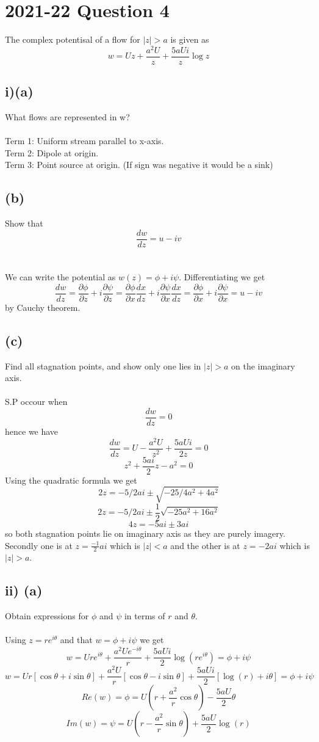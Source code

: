 \documentclass[1pt]{article}
\begin{document}
\tableofcontents
\newpage
\section{2021-22 Question 4}
The complex potentisal of a flow for $|z|>a$ is given as $$w=Uz+\frac{a^2U}{z}+\frac{5aUi}{z}\log z$$
\subsection{i)(a)}
What flows are represented in w?
\\
\\Term 1: Uniform stream parallel to x-axis.
\\Term 2: Dipole at origin.
\\Term 3: Point source at origin. (If sign was negative it would be a sink)
\subsection{(b)}
Show that $$\frac{dw}{dz}=u-iv$$
\\
\\ We can write the potential as $w(z)=\phi+i\psi$. Differentiating we get $$\frac{dw}{dz}=\frac{\partial\phi}{\partial z}+i\frac{\partial \psi}{\partial z}=\frac{\partial\phi}{\partial x}\frac{dx}{dz}+i\frac{\partial\psi}{\partial x}\frac{dx}{dz}=\frac{\partial\phi}{\partial x}+i\frac{\partial\psi}{\partial x}=u-iv$$ by Cauchy theorem.
\subsection{(c)}
Find all stagnation points, and show only one lies in $|z|>a$ on the imaginary axis.
\\
\\S.P occour when $$\frac{dw}{dz}=0$$ hence we have $$\frac{dw}{dz}=U-\frac{a^2U}{z^2}+\frac{5aUi}{2z}=0$$
$$z^2+\frac{5ai}{2}z-a^2=0$$ Using the quadratic formula we get $$2z=-5/2ai\pm \sqrt{-25/4a^2+4a^2}$$ $$2z=-5/2ai\pm \frac{1}{2}\sqrt{-25a^2+16a^2}$$
$$4z=-5ai\pm 3ai$$ so both stagnation points lie on imaginary axis as they are purely imagery. Secondly one is at $z=\frac{-1}{2}ai$ which is $|z|<a$ and the other is at $z=-2ai$ which is $|z|>a$.
\subsection{ii) (a)}
Obtain expressions for $\phi$ and $\psi$ in terms of $r$ and $\theta$.
\\
\\Using $z=re^{i\theta}$ and that $w=\phi+i\psi$ we get $$w=Ure^{i\theta}+\frac{a^2Ue^{-i\theta}}{r}+\frac{5aUi}{2}\log(re^{i\theta})=\phi+i\psi$$
$$w=Ur[\cos\theta+i\sin\theta]+\frac{a^2U}{r}[\cos\theta-i\sin\theta]+\frac{5aUi}{2}[\log(r)+i\theta]=\phi+i\psi$$
$$Re(w)=\phi=U(r+\frac{a^2}{r}\cos\theta)-\frac{5aU}{2}\theta$$
$$Im(w)=\psi=U(r-\frac{a^2}{r}\sin\theta)+\frac{5aU}{2}\log(r)$$
\end{document}
